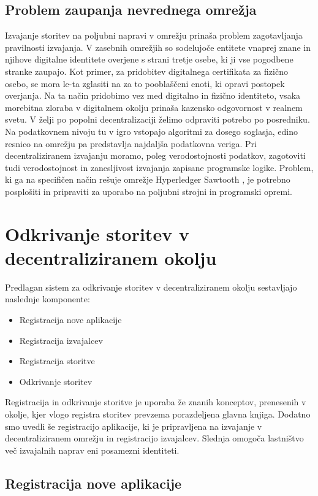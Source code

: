 \documentclass[a4paper, 12pt]{book}
\begin{document}
\subsection{Problem zaupanja nevrednega omrežja}
Izvajanje storitev na poljubni napravi v omrežju prinaša problem zagotavljanja pravilnosti izvajanja.
V zasebnih omrežjih so sodelujoče entitete vnaprej znane in njihove digitalne identitete overjene s strani tretje osebe, ki ji vse pogodbene stranke zaupajo.
Kot primer, za pridobitev digitalnega certifikata za fizično osebo, se mora le-ta zglasiti na za to pooblaščeni enoti, ki opravi postopek overjanja.
Na ta način pridobimo vez med digitalno in fizično identiteto, vsaka morebitna zloraba v digitalnem okolju prinaša kazensko odgovornost v realnem svetu.
V želji po popolni decentralizaciji želimo odpraviti potrebo po posredniku.
Na podatkovnem nivoju tu v igro vstopajo algoritmi za dosego soglasja, edino resnico na omrežju pa predstavlja najdaljša podatkovna veriga.
Pri decentraliziranem izvajanju moramo, poleg verodostojnosti podatkov, zagotoviti tudi verodostojnost in zanesljivost izvajanja zapisane programske logike.
Problem, ki ga na specifičen način rešuje omrežje Hyperledger Sawtooth \cite{sawtooth}, je potrebno posplošiti in pripraviti za uporabo na poljubni strojni in programski opremi.

\section{Odkrivanje storitev v decentraliziranem okolju}

Predlagan sistem za odkrivanje storitev v decentraliziranem okolju sestavljajo naslednje komponente:
\begin{itemize}
	\item Registracija nove aplikacije
	\item Registracija izvajalcev
	\item Registracija storitve
	\item Odkrivanje storitev
\end{itemize}

Registracija in odkrivanje storitve je uporaba že znanih konceptov, prenesenih v okolje, kjer vlogo registra storitev prevzema porazdeljena glavna knjiga.
Dodatno smo uvedli še registracijo aplikacije, ki je pripravljena na izvajanje v decentraliziranem omrežju in registracijo izvajalcev.
Slednja omogoča lastništvo več izvajalnih naprav eni posamezni identiteti.


\subsection{Registracija nove aplikacije}
\label{registerService}
\end{document}
